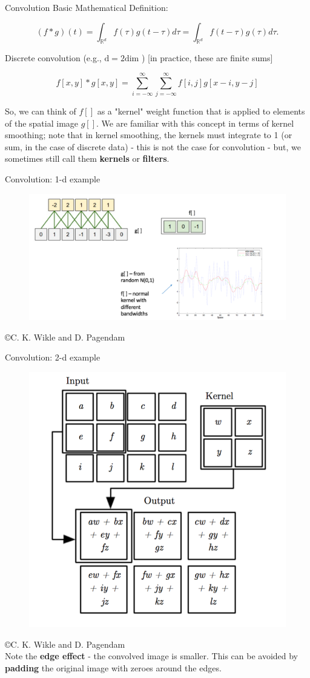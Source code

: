 \documentclass{beamer}
\begin{document}
\begin{frame}{Convolution}
Basic Mathematical Definition:

$$
(f * g)(t)=\int_{\mathbb{R}^{d}} f(\tau) g(t-\tau) d \tau=\int_{\mathbb{R}^{d}} f(t-\tau) g(\tau) d \tau .
$$

Discrete convolution (e.g., $\mathrm{d}=2 \mathrm{dim}$ ) [in practice, these are finite sums]

$$
f[x, y] * g[x, y]=\sum_{i=-\infty}^{\infty} \sum_{j=-\infty}^{\infty} f[i, j] g[x-i, y-j]
$$

So, we can think of $f[]$ as a "kernel" weight function that is applied to elements of the spatial image $g[]$. We are familiar with this concept in terms of kernel smoothing; note that in kernel smoothing, the kernels must integrate to 1 (or sum, in the case of discrete data) - this is not the case for convolution - but, we sometimes still call them \textbf{kernels} or \textbf{filters}.
\end{frame}
\begin{frame}{Convolution: 1-d example}
\begin{figure}
\includegraphics[width=\textwidth]{Images/1dconv.png}
\end{figure}
\centering \copyright C. K. Wikle and D. Pagendam
\end{frame}
\begin{frame}{Convolution: 2-d example}
\begin{figure}
\includegraphics[width=0.45\linewidth]{Images/2dconv.png}
\end{figure}
\centering \copyright C. K. Wikle and D. Pagendam \\
Note the \textbf{edge effect} - the convolved image is smaller. This can be avoided by \textbf{padding} the original image with zeroes around the edges.
\end{frame}
\end{document}
